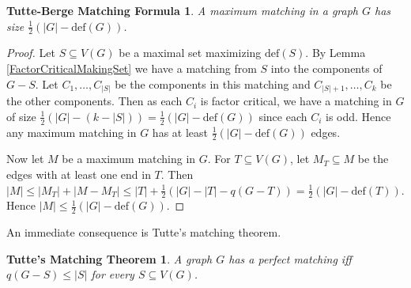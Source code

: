 \documentclass[12pt]{article}
\theoremstyle{plain}
\newtheorem*{TutteMatching}{Tutte's Matching Theorem}
\newtheorem*{TutteBergeMatching}{Tutte-Berge Matching Formula}
\theoremstyle{definition}
\theoremstyle{remark}
\newcommand{\card}[1]{\left|#1\right|}
\newcommand{\defic}[1]{\text{def}(#1)}
\begin{document}
\begin{TutteBergeMatching}
A maximum matching in a graph $G$ has size $\frac12 (\card{G} - \defic{G})$.
\end{TutteBergeMatching}
\begin{proof}
Let $S \subseteq V(G)$ be a maximal set maximizing $\defic{S}$.  By Lemma \ref{FactorCriticalMakingSet} we have a matching from $S$ into the components of $G-S$.  Let $C_1, \ldots, C_{\card{S}}$ be the components in this matching and $C_{\card{S} + 1}, \ldots, C_k$ be the other components.  Then as each $C_i$ is factor critical, we have a matching in $G$ of size $\frac12 (\card{G} - (k - \card{S})) = \frac12 (\card{G} - \defic{G})$ since each $C_i$ is odd.  Hence any maximum matching in $G$ has at least $\frac12 (\card{G} - \defic{G})$ edges.

Now let $M$ be a maximum matching in $G$.  For $T \subseteq V(G)$, let $M_T \subseteq M$ be the edges with at least one end in $T$. Then $\card{M} \leq \card{M_T} + \card{M-M_T} \leq \card{T} + \frac12(\card{G} - \card{T} - q(G - T)) = \frac12(\card{G} - \defic{T})$.  Hence $\card{M} \leq \frac12(\card{G} - \defic{G})$.
\end{proof}

An immediate consequence is Tutte's matching theorem.

\begin{TutteMatching}
A graph $G$ has a perfect matching iff $q(G - S) \leq \card{S}$ for every $S \subseteq V(G)$.
\end{TutteMatching}
\end{document}
